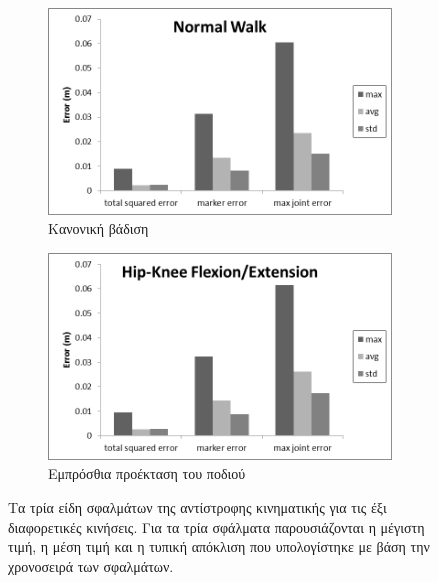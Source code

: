 \begin{figure}[H]
    \begin{subfigure}[t]{.48\textwidth}
        \includegraphics[width=\textwidth, keepaspectratio]{fig/ik-reg5.png}
        \caption{Κανονική βάδιση}
        \label{fig:noraml-walk}
    \end{subfigure}
    \begin{subfigure}[t]{.48\textwidth}
        \includegraphics[width=\textwidth, keepaspectratio]{fig/ik-reg6.png}
        \caption{Εμπρόσθια προέκταση του ποδιού}
        \label{fig:knee-hip-extension}
    \end{subfigure}
    \caption{Τα τρία είδη σφαλμάτων της αντίστροφης κινηματικής για τις έξι διαφορετικές κινήσεις. Για τα τρία σφάλματα παρουσιάζονται η μέγιστη τιμή, η μέση τιμή και η τυπική απόκλιση που υπολογίστηκε με βάση την χρονοσειρά των σφαλμάτων.}
    \label{fig:ik-error-regions}
\end{figure}

